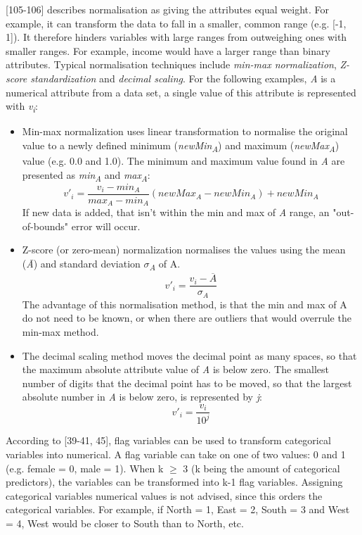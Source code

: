 \textcite{han2011data}[105-106] describes normalisation as giving the attributes equal weight. For example, it can transform the data to fall in a smaller, common range (e.g. [-1, 1]). It therefore hinders variables with large ranges from outweighing ones with smaller ranges. For example, income would have a larger range than binary attributes. Typical normalisation techniques include \textit{min-max normalization}, \textit{Z-score standardization} and \textit{decimal scaling}. For the following examples, \textit{A} is a numerical attribute from a data set, a single value of this attribute is represented with \textit{v\textsubscript{i}}:
\begin{itemize}
  \item Min-max normalization uses linear transformation to normalise the original value to a newly defined minimum (\textit{newMin\textsubscript{A}}) and maximum (\textit{newMax\textsubscript{A}}) value (e.g. 0.0 and 1.0). The minimum and maximum value found in \textit{A} are presented as \textit{min\textsubscript{A}} and \textit{max\textsubscript{A}}:
  \[
    v'_i = \frac{v_i - min_A}{max_A - min_A}(newMax_A - newMin_A) + newMin_A
  \]
  If new data is added, that isn't within the min and max of \textit{A} range, an "out-of-bounds" error will occur.

  \item Z-score (or zero-mean) normalization normalises the values using the mean (\textit{\={A}}) and standard deviation \textit{$\sigma$\textsubscript{A}} of A.
  \[
    v'_i = \frac{v_i - \overline{A}}{\sigma_A}
  \]
  The advantage of this normalisation method, is that the min and max of A do not need to be known, or when there are outliers that would overrule the min-max method.

  \item The decimal scaling method moves the decimal point as many spaces, so that the maximum absolute attribute value of \textit{A} is below zero. The smallest number of digits that the decimal point has to be moved, so that the largest absolute number in \textit{A} is below zero, is represented by \textit{j}:
  \[
    v'_i = \frac{v_i}{10^j}
  \]
\end{itemize}





According to \textcite{DataMiningAndPredictiveAnalytics}[39-41, 45], flag variables can be used to transform categorical variables into numerical. A flag variable can take on one of two values: 0 and 1 (e.g. female = 0, male = 1). When k $\geq$ 3 (k being the amount of categorical predictors), the variables can be transformed into k-1 flag variables. Assigning categorical variables numerical values is not advised, since this orders the categorical variables. For example, if North = 1, East = 2, South = 3 and West = 4, West would be closer to South than to North, etc.


